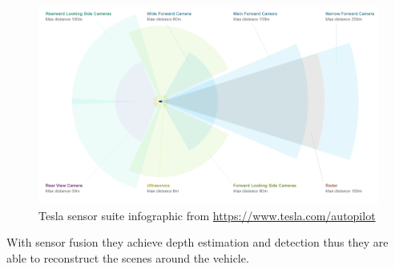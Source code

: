 \begin{figure}[!ht]
  \centering
  \includegraphics[width=150mm, keepaspectratio]{figures/teslasensors.png}
  \caption{Tesla sensor suite infographic from \url{https://www.tesla.com/autopilot}}
  \label{fig:teslasensors}
\end{figure}

With sensor fusion they achieve depth estimation and detection thus they are able to
reconstruct the scenes around the vehicle.